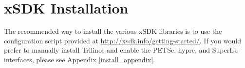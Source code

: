 \chapter{xSDK Installation}
The recommended way to install the various xSDK libraries is to use the
configuration script provided at
\url{http://xsdk.info/getting-started/}.  
If you would prefer to manually install Trilinos and enable the PETSc, hypre,
and SuperLU interfaces, please see Appendix \ref{install_appendix}.